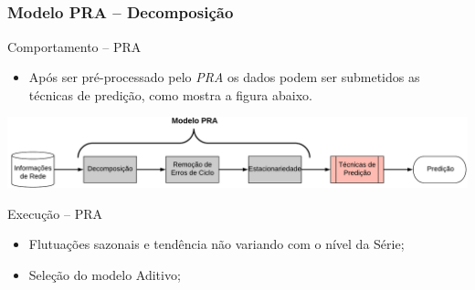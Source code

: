 \documentclass[aspectratio=169]{beamer}
\begin{document}
\subsection{}

\begin{frame}
\frametitle{Modelo PRA -- Decomposição}
\begin{block}{Comportamento -- PRA}
    \begin{itemize}\small
    \item Após ser pré-processado pelo \emph{PRA} os dados podem ser submetidos as técnicas de predição, como mostra a figura abaixo. 
    \end{itemize}
\end{block}
\centering
\includegraphics[width=1\textwidth,angle=0]{Modelo-PRA}
\begin{block}{Execução -- PRA}
    \begin{itemize}\small
    \item Flutuações sazonais e tendência não variando com o nível da Série;
    \item Seleção do modelo Aditivo;
    \end{itemize}
\end{block}

\end{frame}
\end{document}
